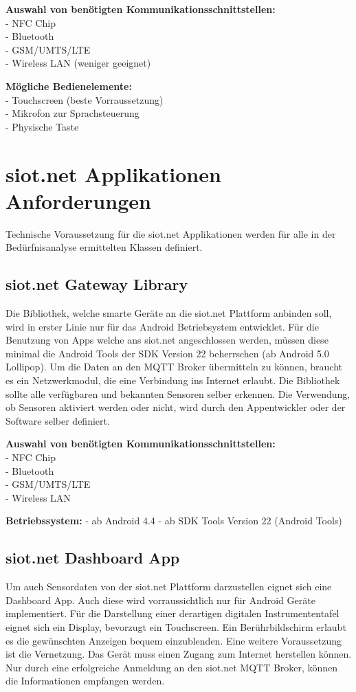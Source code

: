 \textbf{Auswahl von benötigten Kommunikationsschnittstellen:}\\
- NFC Chip\\
- Bluetooth\\
- GSM/UMTS/LTE\\
- Wireless LAN (weniger geeignet)

\textbf{Mögliche Bedienelemente:}\\
- Touchscreen (beste Vorraussetzung)\\
- Mikrofon zur Sprachsteuerung\\
- Physische Taste\\

\section{siot.net Applikationen Anforderungen}
Technische Voraussetzung für die siot.net Applikationen werden für alle in der Bedürfnisanalyse ermittelten Klassen definiert.

\subsection{siot.net Gateway Library}
Die Bibliothek, welche smarte Geräte an die siot.net Plattform anbinden soll, wird in erster Linie nur für das Android Betriebsystem entwicklet. Für die Benutzung von Apps welche ans siot.net angeschlossen werden, müssen diese minimal die Android Tools der SDK Version 22 beherrschen (ab Android 5.0 Lollipop). Um die Daten an den MQTT Broker übermitteln zu können, braucht es ein Netzwerkmodul, die eine Verbindung ins Internet erlaubt. Die Bibliothek sollte alle verfügbaren und bekannten Sensoren selber erkennen. Die Verwendung, ob Sensoren aktiviert werden oder nicht, wird durch den Appentwickler oder der Software selber definiert.

\textbf{Auswahl von benötigten Kommunikationsschnittstellen:}\\
- NFC Chip\\
- Bluetooth\\
- GSM/UMTS/LTE\\
- Wireless LAN

\textbf{Betriebssystem:}
- ab Android 4.4
- ab SDK Tools Version 22 (Android Tools)

\subsection{siot.net Dashboard App}
Um auch Sensordaten von der siot.net Plattform darzustellen eignet sich eine Dashboard App. Auch diese wird vorraussichtlich nur für Android Geräte implementiert. Für die Darstellung einer derartigen digitalen Instrumententafel eignet sich ein Display, bevorzugt ein Touchscreen. Ein Berührbildschirm erlaubt es die gewünschten Anzeigen bequem einzublenden. Eine weitere Voraussetzung ist die Vernetzung. Das Gerät muss einen Zugang zum Internet herstellen können. Nur durch eine erfolgreiche Anmeldung an den siot.net MQTT Broker, können die Informationen empfangen werden.

